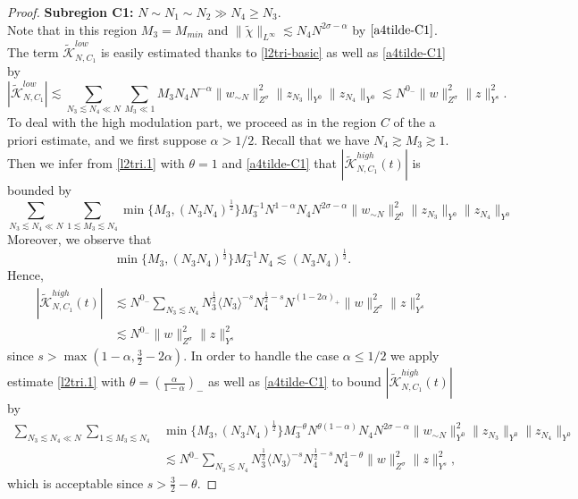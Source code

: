 \documentclass{amsart}
\theoremstyle{definition}
\theoremstyle{remark}
\numberwithin{equation}{section}
\newcommand\cro[1]{\langle #1 \rangle}
\begin{document}
\begin{proof}
\noindent
\textbf{Subregion C1:} $N \sim N_1\sim N_2\gg N_4\ge N_3$. \\
Note that in this region $M_3=M_{min}$ and $\|\widetilde{\chi}\|_{L^{\infty}} \lesssim N_4N^{2\sigma-\alpha}$ by $\eqref{a4tilde-C1}$. The term $\widetilde{\mathcal{K}}_{N,C_1}^{low}$ is easily estimated thanks to \eqref{l2tri-basic} as well as \eqref{a4tilde-C1} by
$$
|\widetilde{\mathcal{K}}_{N,C_1}^{low}| \lesssim \sum_{N_3\lesssim N_4\ll N} \sum_{M_3\ll 1} M_3 N_4 N^{-\alpha} \|w_{\sim N}\|_{Z^\sigma}^2 \|z_{N_3}\|_{Y^0} \|z_{N_4}\|_{Y^0}\lesssim N^{0_-} \|w\|_{Z^\sigma}^2 \|z\|_{Y^s}^2.
$$
To deal with the high modulation part, we proceed as in the region $C$ of the a priori estimate, and we first suppose $\alpha>1/2$. Recall that we have $N_4\gtrsim M_3\gtrsim 1$. Then we infer from \eqref{l2tri.1} with $\theta=1$ and \eqref{a4tilde-C1} that $ |\widetilde{\mathcal{K}}_{N,C_1}^{high}(t)|$ is bounded by
 $$
  \sum_{N_3\lesssim N_4\ll N}\sum_{1\lesssim M_3\lesssim N_4} \min\{M_3, (N_3N_4)^{\frac 12}\}M_3^{-1} N^{1-\alpha} N_4 N^{2\sigma-\alpha}  
    \|w_{\sim N}\|_{Z^0}^2 \|z_{N_3}\|_{Y^0} \|z_{N_4}\|_{Y^0}
$$
Moreover, we observe that
$$
\min\{M_3, (N_3N_4)^{\frac 12}\} M_3^{-1} N_4 \lesssim (N_3N_4)^{\frac 12}.
$$  
Hence,
\begin{align*}
  |\widetilde{\mathcal{K}}_{N,C_1}^{high}(t)| &\lesssim  N^{0_-} \sum_{N_3\lesssim N_4} N_3^{\frac 12}\cro{N_3}^{-s} N_4^{\frac 12-s} N^{(1-2\alpha)_+}  \|w\|_{Z^\sigma}^2 \|z\|_{Y^s}^2\\
  &\lesssim N^{0_-} \|w\|_{Z^\sigma}^2 \|z\|_{Y^s}^2
\end{align*}
since $s>\max(1-\alpha, \frac 32-2\alpha)$. In order to handle the case $\alpha\le 1/2$ we apply estimate \eqref{l2tri.1} with $\theta = \left(\frac{\alpha}{1-\alpha}\right)_-$ as well as \eqref{a4tilde-C1} to bound $ |\widetilde{\mathcal{K}}_{N,C_1}^{high}(t)|$ by
\begin{align*}
\sum_{N_3\lesssim N_4\ll N}\sum_{1\lesssim M_3\lesssim N_4} &\min\{M_3, (N_3N_4)^{\frac 12}\} M_3^{-\theta} N^{\theta(1-\alpha)} N_4 N^{2\sigma-\alpha}  
    \|w_{\sim N}\|_{Y^0}^2 \|z_{N_3}\|_{Y^0} \|z_{N_4}\|_{Y^0}\\
    &\lesssim N^{0_-} \sum_{N_3\lesssim N_4} N_3^{\frac 12}\cro{N_3}^{-s} N_4^{\frac 12-s} N_4^{1-\theta} \|w\|_{Z^\sigma}^2 \|z\|_{Y^s}^2,
\end{align*}
which is acceptable since $s>\frac 32-\theta$.
  

\end{proof}
\end{document}
